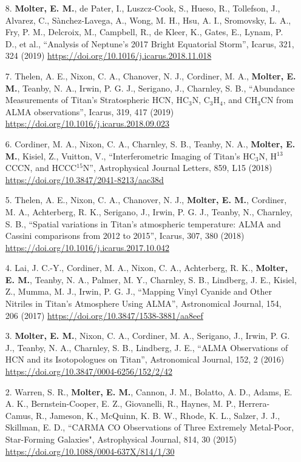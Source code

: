 \documentclass[margin, 10pt]{res} %
\begin{document}
\begin{resume}
{\begin{enumerate}
\item[8.] {\bf Molter, E. M.}, de Pater, I., Luszcz-Cook, S., Hueso, R., Tollefson, J., Alvarez, C., S\`anchez-Lavega, A., Wong, M. H., Hsu, A. I., Sromovsky, L. A., Fry, P. M., Delcroix, M., Campbell, R., de Kleer, K., Gates, E., Lynam, P. D., et al., ``Analysis of Neptune's 2017 Bright Equatorial Storm'', Icarus, 321, 324 (2019) \url{https://doi.org/10.1016/j.icarus.2018.11.018}

\item[7.] Thelen, A. E., Nixon, C. A., Chanover, N. J., Cordiner, M. A., {\bf Molter, E. M.}, Teanby, N. A., Irwin, P. G. J., Serigano, J., Charnley, S. B., ``Abundance Measurements of Titan's Stratospheric HCN, HC$_3$N, C$_3$H$_4$, and CH$_3$CN from ALMA observations'', Icarus, 319, 417 (2019) \url{https://doi.org/10.1016/j.icarus.2018.09.023}

\item[6.] Cordiner, M. A., Nixon, C. A., Charnley, S. B., Teanby, N. A., {\bf Molter, E. M.}, Kisiel, Z., Vuitton, V., ``Interferometric Imaging of Titan's HC$_3$N, H$^{13}$\textrm{CCC}N, and HCCC$^{15}$N'', Astrophysical Journal Letters, 859, L15 (2018) \url{https://doi.org/10.3847/2041-8213/aac38d}

\item[5.] Thelen, A. E.,  Nixon, C. A., Chanover, N. J., {\bf Molter, E. M.}, Cordiner, M. A., Achterberg, R. K., Serigano, J., Irwin, P. G. J., Teanby, N., Charnley, S. B., ``Spatial variations in Titan's atmospheric temperature: ALMA and Cassini comparisons from 2012 to 2015'', Icarus, 307, 380 (2018) \url{https://doi.org/10.1016/j.icarus.2017.10.042}

\item[4.] Lai, J. C.-Y., Cordiner, M. A., Nixon, C. A., Achterberg, R. K., {\bf Molter, E. M.}, Teanby, N. A., Palmer, M. Y., Charnley, S. B., Lindberg, J. E., Kisiel, Z., Mumma, M. J., Irwin, P. G. J., ``Mapping Vinyl Cyanide and Other Nitriles in Titan’s Atmosphere Using ALMA'', Astronomical Journal, 154, 206 (2017) \url{https://doi.org/10.3847/1538-3881/aa8eef}

\item[3.] {\bf Molter, E. M.}, Nixon, C. A., Cordiner, M. A., Serigano, J., Irwin, P. G. J., Teanby, N. A., Charnley, S. B., Lindberg, J. E., ``ALMA Observations of
  HCN and its Isotopologues on Titan'', Astronomical Journal, 152, 2 (2016) \url{https://doi.org/10.3847/0004-6256/152/2/42}
  
\item[2.] Warren, S. R., {\bf Molter, E. M.}, Cannon, J. M., Bolatto, A. D., Adams, E. A. K., Bernstein-Cooper, E. Z., Giovanelli, R., Haynes, M. P., Herrera-Camus, R., Jameson, K., McQuinn, K. B. W., Rhode, K. L., Salzer, J. J., Skillman, E. D., ``CARMA
  CO Observations of Three Extremely Metal-Poor, Star-Forming
  Galaxies", Astrophysical Journal, 814, 30 (2015) \url{https://doi.org/10.1088/0004-637X/814/1/30}
  

\end{enumerate}}
\end{resume}
\end{document}
